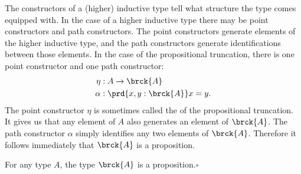   \medskip
The constructors of a (higher) inductive type tell what structure the type comes equipped with. In the case of a higher inductive type there may be point constructors and path constructors. The point constructors generate elements of the higher inductive type, and the path constructors generate identifications between those elements. In the case of the propositional truncation, there is one point constructor and one path constructor:
\begin{align*}
  \eta & : A \to \brck{A}\\*
  \alpha & : \prd{x,y:\brck{A}}x=y.
\end{align*}
The point constructor $\eta$ is sometimes called the  of the propositional truncation. It gives us that any element of $A$ also generates an element of $\brck{A}$. The path constructor $\alpha$ simply identifies any two elements of $\brck{A}$. Therefore it follows immediately that $\brck{A}$ is a proposition.

\begin{lem}
  For any type $A$, the type $\brck{A}$ is a proposition.\hfill $\square$ 
\end{lem}

